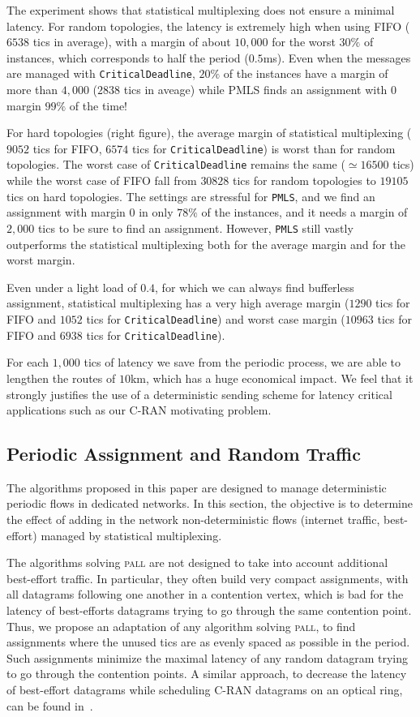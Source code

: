 \documentclass[a4paper,10pt]{journal}
\newcommand\PMLS{\texttt{PMLS}\xspace}
\newcommand\critdead{\texttt{CriticalDeadline}\xspace}
\newcommand\pall{\textsc{pall}\xspace}
\begin{document}
   The experiment shows that statistical multiplexing does not ensure a minimal latency. 
    For random topologies, the latency is extremely high when using FIFO ($6538$ tics in average), with a margin of about $10,000$ for the worst $30\%$ of instances, which corresponds to half the period ($0.5$ms). Even when the messages are managed with \critdead, $20\%$ of the instances have a margin of more than $4,000$ ($2838$ tics in aveage) while PMLS finds an assignment with $0$ margin $99\%$ of the time! 
    
    For hard topologies (right figure), the average margin of statistical multiplexing ($9052$ tics for FIFO, $6574$ tics for \critdead) is worst than for random topologies. The worst case of \critdead  remains the same ($\simeq 16500$ tics) while the worst case of FIFO fall from $30828$ tics for random topologies to $19105$ tics on hard topologies. The settings are stressful for \PMLS, and we find an assignment with margin $0$ in only $78\%$ of the instances, and it needs a margin of $2,000$ tics to be sure to find an assignment. However, \PMLS still vastly outperforms the statistical multiplexing both for the average margin and for the worst margin. 
    
    Even under a light load of $0.4$, for which we can always find bufferless assignment, statistical multiplexing has a very high average margin ($1290$ tics for FIFO and $1052$ tics for \critdead) and worst case margin ($10963$ tics for FIFO and $6938$ tics for \critdead).

    For each $1,000$ tics of latency we save from the periodic process, we are able to lengthen the routes of $10$km, which has a huge economical impact. We feel that it strongly justifies the use of a deterministic sending scheme for latency critical applications such as our C-RAN motivating problem.    
     
    \subsection{Periodic Assignment and Random Traffic}
    
    The algorithms proposed in this paper are designed to manage deterministic periodic flows in dedicated networks. In this section, the objective is to determine the effect of adding in the network non-deterministic flows (internet traffic, best-effort) managed by statistical multiplexing.

    The algorithms solving \pall are not designed to take into account additional best-effort traffic. In particular, they often build very compact assignments, with all datagrams following one another in a contention vertex, which is bad for the latency of best-efforts datagrams trying to go through the same contention point. Thus, we propose an adaptation of any algorithm solving \pall, to find assignments where the unused tics are as evenly spaced as possible in the period. Such assignments minimize the maximal latency of any random datagram trying to go through the contention points. A similar approach, to decrease the latency of best-effort datagrams while scheduling C-RAN datagrams on an optical ring, can be found in~\cite{DBLP:conf/ondm/BarthGS19}.
    
\end{document}
